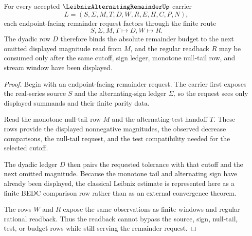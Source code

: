 \begin{theorem}
\label{thm:leibniz-alternating-remainder-tail-bound}
For every accepted $\LeibnizAlternatingRemainderUp$ carrier
$$
L=(S,\Sigma,M,T,D,W,R,E,H,C,P,N),
$$
each endpoint-facing remainder request factors through the finite route
$$
S,\Sigma,M,T \longmapsto D,W \longmapsto R .
$$
The dyadic row $D$ therefore binds the absolute remainder budget to the next omitted displayed magnitude read from $M$, and the regular readback $R$ may be consumed only after the same cutoff, sign ledger, monotone null-tail row, and stream window have been displayed.
\end{theorem}
\begin{proof}
Begin with an endpoint-facing remainder request. The carrier first exposes the real-series source $S$ and the alternating-sign ledger $\Sigma$, so the request sees only displayed summands and their finite parity data.

Read the monotone null-tail row $M$ and the alternating-test handoff $T$. These rows provide the displayed nonnegative magnitudes, the observed decrease comparisons, the null-tail request, and the test compatibility needed for the selected cutoff.

The dyadic ledger $D$ then pairs the requested tolerance with that cutoff and the next omitted magnitude. Because the monotone tail and alternating sign have already been displayed, the classical Leibniz estimate is represented here as a finite BEDC comparison row rather than as an external convergence theorem.

The rows $W$ and $R$ expose the same observations as finite windows and regular rational readback. Thus the readback cannot bypass the source, sign, null-tail, test, or budget rows while still serving the remainder request.
\end{proof}


